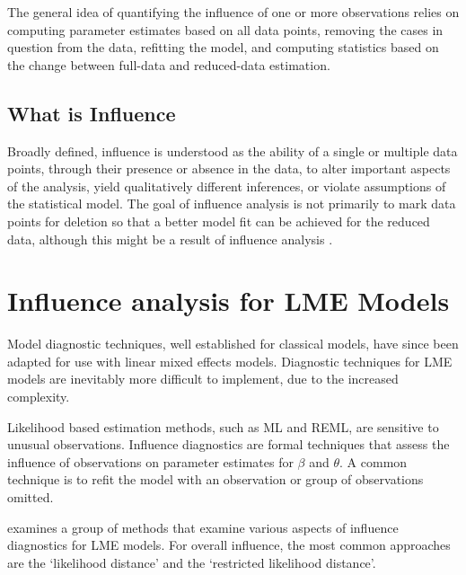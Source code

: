 \documentclass[Main.tex]{subfiles}
\begin{document}
		
		The general idea of quantifying the influence of one or more observations relies on computing parameter estimates based on all data points, removing the cases in question from the data, refitting the model, and computing statistics based on the change between full-data and reduced-data estimation. 

			\newpage

\subsection{What is Influence} %

Broadly defined, influence is understood as the ability of a single or multiple data points, through their presence or absence in the data, to alter important aspects of the analysis, yield qualitatively different inferences, or violate assumptions of the statistical model. The goal of influence analysis is not primarily to mark data
points for deletion so that a better model fit can be achieved for the reduced data, although this might be a result of influence analysis \citep{schabenberger}.



\newpage



			\section{Influence analysis for LME Models} %

				
				Model diagnostic techniques, well established for classical models, have since been adapted for use with linear mixed effects models. Diagnostic techniques for LME models are inevitably more difficult to implement, due to the increased complexity.
					
			Likelihood based estimation methods, such as ML and REML, are sensitive to unusual observations. Influence diagnostics are formal techniques that assess the influence of observations on parameter estimates for $\beta$ and $\theta$. A common technique is to refit the model with an observation or group of observations omitted.
			
			\citet{west} examines a group of methods that examine various aspects of influence diagnostics for LME models.
			For overall influence, the most common approaches are the `likelihood distance' and the `restricted likelihood distance'.
			
\end{document}
